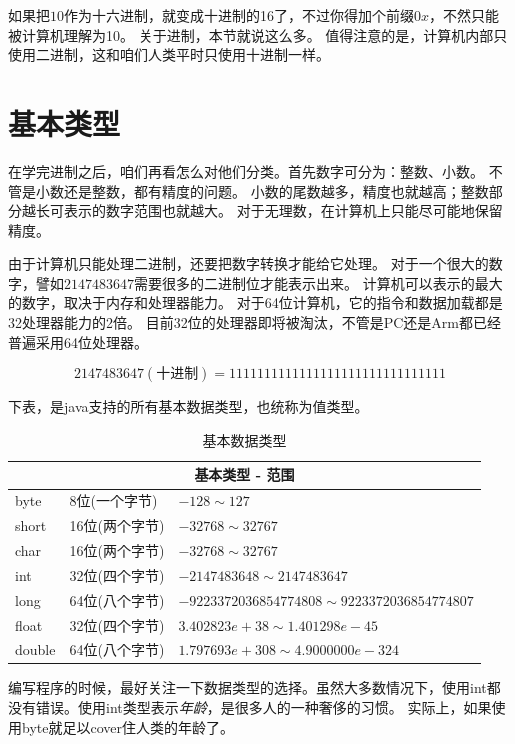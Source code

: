 如果把$10$作为十六进制，就变成十进制的16了，不过你得加个前缀$0x$，不然只能被计算机理解为10。
关于进制，本节就说这么多。
值得注意的是，计算机内部只使用二进制，这和咱们人类平时只使用十进制一样。

\section{基本类型}
在学完进制之后，咱们再看怎么对他们分类。首先数字可分为：整数、小数。
不管是小数还是整数，都有精度的问题。
小数的尾数越多，精度也就越高；整数部分越长可表示的数字范围也就越大。
对于无理数，在计算机上只能尽可能地保留精度。

由于计算机只能处理二进制，还要把数字转换才能给它处理。
对于一个很大的数字，譬如$2147483647$需要很多的二进制位才能表示出来。
计算机可以表示的最大的数字，取决于内存和处理器能力。
对于64位计算机，它的指令和数据加载都是32处理器能力的2倍。
目前32位的处理器即将被淘汰，不管是PC还是Arm都已经普遍采用64位处理器。

\begin{equation}
    2147483647(\text{十进制}) = 1111111111111111111111111111111
\end{equation}


\noindent
下表，是java支持的所有基本数据类型，也统称为值类型。
\begin{table}[!htbp]\centering
\small
\begin{tabular}{|p{1cm}|p{3cm}|p{7cm}|}
\hline
\multicolumn{3}{|c|}{基本类型 - 范围}\\
\hline
byte&8位(一个字节)&$-128\sim127$\\
short&16位(两个字节)&$-32768\sim32767$\\
char&16位(两个字节)&$-32768\sim32767$\\
int&32位(四个字节)&$-2147483648\sim2147483647$\\
long&64位(八个字节)&$-9223372036854774808\sim9223372036854774807$\\
float&32位(四个字节)&$3.402823e+38\sim1.401298e-45$\\
double&64位(八个字节)&$1.797693e+308\sim4.9000000e-324$\\
\hline
\end{tabular}
\caption{基本数据类型}
\label{table:part1_data_types}
\end{table}

编写程序的时候，最好关注一下数据类型的选择。虽然大多数情况下，使用int都没有错误。使用int类型表示\emph{年龄}，是很多人的一种奢侈的习惯。
实际上，如果使用byte就足以cover住人类的年龄了。


